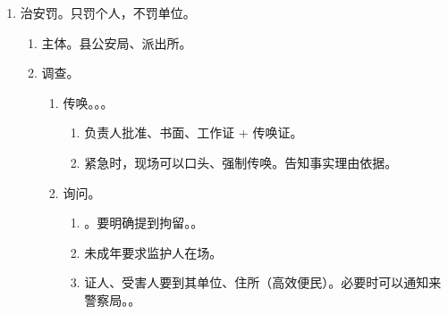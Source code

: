 \begin{enumerate}
\begin{enumerate}
\begin{enumerate}
\begin{enumerate}
\begin{itemize}
                                  \item 拘留不属于法定听证情形，属于约定听证。实践中忙不过来。
                                  \item 不属于法定听证的情形，多提一嘴不算违法！！。
                                  \item {}。
                                \end{itemize}
                          \item 5207 没有 2。5 日内申请，7 日前告知 \yjt {}。
                          \item 申请人、第三人可以委托 1 - 2 个代理人。
                          \item {}。
                          \item 笔录。排他效力，是后续决定的唯一根据/依据。。
                        \end{enumerate}
                \end{enumerate}
        \end{enumerate}
  \item 治安罚。只罚个人，不罚单位。
        \begin{enumerate}
          \item 主体。县公安局、派出所。
          \item 调查。
                \begin{enumerate}
                  \item 传唤。。。
                        \begin{enumerate}
                          \item 负责人批准、书面、工作证 + 传唤证。
                          \item 紧急时，现场可以口头、强制传唤。告知事实理由依据。
                        \end{enumerate}
                  \item 询问。
                        \begin{enumerate}
                          \item {}。要明确提到拘留。。
                          \item 未成年要求监护人在场。
                          \item 证人、受害人要到其单位、住所（高效便民）。必要时可以通知来警察局。。

\end{enumerate}
\end{enumerate}
\end{enumerate}
\end{enumerate}
